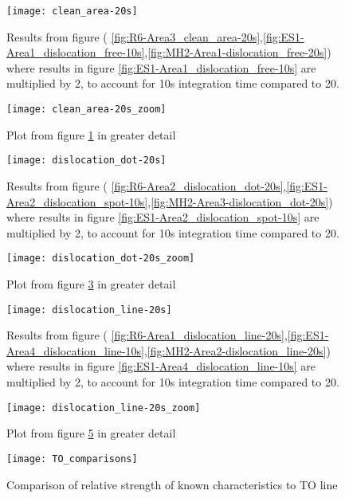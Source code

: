 \begin{figure}[H]
\centering
\texttt{[image: clean\_area-20s]}
\caption[Comparisons in a clean area]{Results from figure ( \ref{fig:R6-Area3_clean_area-20s},\ref{fig:ES1-Area1_dislocation_free-10s},\ref{fig:MH2-Area1-dislocation_free-20s}) where results in figure \ref{fig:ES1-Area1_dislocation_free-10s} are multiplied by 2, to account for 10s integration time compared to 20.}
\label{fig:clean_area-20s_comparison}%
\end{figure}

\begin{figure}[H]
\centering
\texttt{[image: clean\_area-20s\_zoom]}
\caption[Comparisons in a clean area]{Plot from figure \ref{fig:clean_area-20s_comparison} in greater detail}
\label{fig:clean_area-20s_zoom_comparison}%
\end{figure}

\begin{figure}[H]
\centering
\texttt{[image: dislocation\_dot-20s]}
\caption[Comparisons in a dislocation dot]{Results from figure ( \ref{fig:R6-Area2_dislocation_dot-20s},\ref{fig:ES1-Area2_dislocation_spot-10s},\ref{fig:MH2-Area3-dislocation_dot-20s}) where results in figure \ref{fig:ES1-Area2_dislocation_spot-10s} are multiplied by 2, to account for 10s integration time compared to 20. }
\label{fig:dislocation_dot-20s_comparison}%
\end{figure}

\begin{figure}[H]
\centering
\texttt{[image: dislocation\_dot-20s\_zoom]}
\caption[Comparisons in a dislocation dot]{Plot from figure \ref{fig:dislocation_dot-20s_comparison} in greater detail}
\label{fig:dislocation_dot-20s_zoom_comparison}%
\end{figure}

\begin{figure}[H]
\centering
\texttt{[image: dislocation\_line-20s]}
\caption[Comparisons in a dislocation line]{Results from figure ( \ref{fig:R6-Area1_dislocation_line-20s},\ref{fig:ES1-Area4_dislocation_line-10s},\ref{fig:MH2-Area2-dislocation_line-20s}) where results in figure \ref{fig:ES1-Area4_dislocation_line-10s} are multiplied by 2, to account for 10s integration time compared to 20. }
\label{fig:dislocation_line-20s_comparison}%
\end{figure}


\begin{figure}[H]
\centering
\texttt{[image: dislocation\_line-20s\_zoom]}
\caption[Comparisons in a dislocation line]{Plot from figure \ref{fig:dislocation_line-20s_comparison} in greater detail}
\label{fig:dislocation_line-20s_zoom_comparison}%
\end{figure}

\begin{figure}[H]
\centering
\texttt{[image: TO\_comparisons]}
\caption[Comparison or relative strength]{Comparison of relative strength of known characteristics to TO line}
\label{fig:TO_comparisons}%
\end{figure}